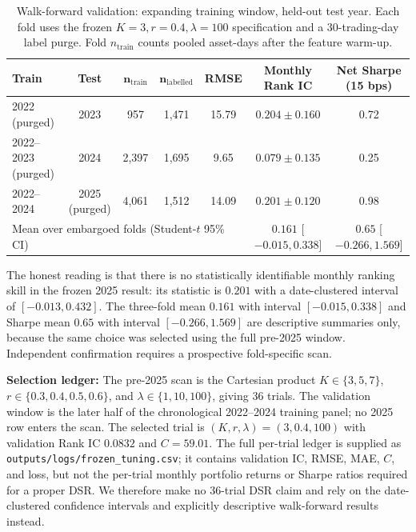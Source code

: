 \documentclass[pdflatex,sn-mathphys-num]{sn-jnl}
\theoremstyle{thmstyleone}
\theoremstyle{thmstyletwo}
\theoremstyle{thmstylethree}
\begin{document}
\begin{table}[htbp]
\centering
\small
\caption{Walk-forward validation: expanding training window, held-out test year. Each fold uses the frozen $K=3,r=0.4,\lambda=100$ specification and a 30-trading-day label purge. Fold $n_{\mathrm{train}}$ counts pooled asset-days after the feature warm-up.}
\label{tab:walkforward}
\begin{tabular}{@{}lcccccc@{}}
\toprule
\textbf{Train} & \textbf{Test} & $\boldsymbol{n_{\mathrm{train}}}$ & $\boldsymbol{n_{\mathrm{labelled}}}$ & \textbf{RMSE} & \textbf{Monthly Rank IC} & \textbf{Net Sharpe (15 bps)} \\
\midrule
2022 (purged) & 2023 & 957 & 1{,}471 & 15.79 & $0.204 \pm 0.160$ & 0.72 \\
2022--2023 (purged) & 2024 & 2{,}397 & 1{,}695 & 9.65 & $0.079 \pm 0.135$ & 0.25 \\
2022--2024 & 2025 (purged) & 4{,}061 & 1{,}512 & 14.09 & $0.201 \pm 0.120$ & 0.98 \\
\midrule
\multicolumn{5}{l}{Mean over embargoed folds (Student-$t$ 95\% CI)} & $0.161$ [$-0.015, 0.338$] & $0.65$ [$-0.266, 1.569$] \\
\bottomrule
\end{tabular}
\end{table}

The honest reading is that there is no statistically identifiable monthly ranking skill in the frozen 2025 result: its statistic is $0.201$ with a date-clustered interval of $[-0.013, 0.432]$. The three-fold mean $0.161$ with interval $[-0.015, 0.338]$ and Sharpe mean $0.65$ with interval $[-0.266,1.569]$ are descriptive summaries only, because the same choice was selected using the full pre-2025 window. Independent confirmation requires a prospective fold-specific scan.

\noindent\textbf{Selection ledger:} The pre-2025 scan is the Cartesian product $K\in\{3,5,7\}$, $r\in\{0.3,0.4,0.5,0.6\}$, and $\lambda\in\{1,10,100\}$, giving 36 trials. The validation window is the later half of the chronological 2022--2024 training panel; no 2025 row enters the scan. The selected trial is $(K,r,\lambda)=(3,0.4,100)$ with validation Rank IC $0.0832$ and $C=59.01$. The full per-trial ledger is supplied as \texttt{outputs/logs/frozen\_tuning.csv}; it contains validation IC, RMSE, MAE, $C$, and loss, but not the per-trial monthly portfolio returns or Sharpe ratios required for a proper DSR. We therefore make no 36-trial DSR claim and rely on the date-clustered confidence intervals and explicitly descriptive walk-forward results instead.
\end{document}
